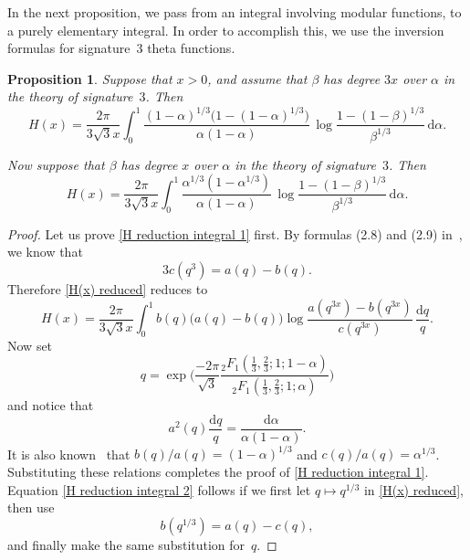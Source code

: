 \documentclass[12pt,reqno]{amsart}
\newtheorem{proposition}{Proposition}
\theoremstyle{remark}
\begin{document}
In the next proposition, we pass from an integral involving modular
functions, to a purely elementary integral.  In order to accomplish
this, we use the inversion formulas for signature~$3$ theta
functions.

\begin{proposition}\label{Theorem on H(x) in elementary integrals}
Suppose that $x>0$, and assume that $\beta$ has degree $3x$ over
$\alpha$ in the theory of signature~$3$. Then
\begin{equation}\label{H reduction integral 1}
H(x)=\frac{2\pi}{3\sqrt{3}x}
\int_{0}^{1}\frac{(1-\alpha)^{1/3}\bigl(1-(1-\alpha)^{1/3}\bigr)}{\alpha(1-\alpha)}
\,\log\frac{1-(1-\beta)^{1/3}}{\beta^{1/3}}\,{{\mathrm d}}\alpha.
\end{equation}

Now suppose that $\beta$ has degree $x$ over $\alpha$ in the
theory of signature~$3$.  Then
\begin{equation}\label{H reduction integral 2}
H(x)=\frac{2\pi}{3\sqrt{3}x}
\int_{0}^{1}\frac{\alpha^{1/3}(1-\alpha^{1/3})}{\alpha(1-\alpha)}
\,\log\frac{1-(1-\beta)^{1/3}}{\beta^{1/3}}\,{{\mathrm d}}\alpha.
\end{equation}
\end{proposition}

\begin{proof}
Let us prove \eqref{H reduction integral 1} first.  By
formulas (2.8) and (2.9) in~\cite[pg.~93--94]{Be5}, we know that
\begin{equation*}
3c(q^3)=a(q)-b(q).
\end{equation*}
Therefore \eqref{H(x) reduced} reduces to
\begin{equation*}
H(x)=\frac{2\pi}{3\sqrt{3}x}\int_{0}^{1}b(q)\bigl(a(q)-b(q)\bigr)
\log\frac{a(q^{3x})-b(q^{3x})}{c(q^{3x})}\,\frac{{{\mathrm d}} q}{q}.
\end{equation*}
Now set
$$
q=\exp\biggl(\frac{-2\pi}{\sqrt{3}}\frac{{}_2F_1(\frac{1}{3},\frac{2}{3};1;1-\alpha)}
{{}_2F_1(\frac{1}{3},\frac{2}{3};1;\alpha)}\biggr)
$$
and notice that
$$
a^2(q)\frac{{{\mathrm d}} q}{q}=\frac{{{\mathrm d}}\alpha}{\alpha(1-\alpha)}.
$$
It is also known~\cite[pg.~103]{Be5} that
$b(q)/a(q)=(1-\alpha)^{1/3}$ and $c(q)/a(q)=\alpha^{1/3}$.
Substituting these relations completes the
proof of \eqref{H reduction integral 1}.  Equation \eqref{H
reduction integral 2} follows if we first let $q\mapsto q^{1/3}$
in \eqref{H(x) reduced}, then use
\begin{equation*}
b(q^{1/3})=a(q)-c(q),
\end{equation*}
and finally make the same substitution for~$q$.
\end{proof}
\end{document}
